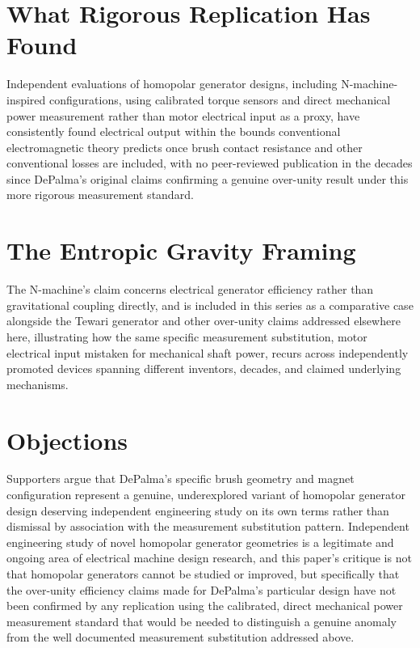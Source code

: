 \documentclass[11pt]{article}
\begin{document}
\section{What Rigorous Replication Has Found}

Independent evaluations of homopolar generator designs, including N-machine-inspired configurations, using calibrated torque sensors and direct mechanical power measurement rather than motor electrical input as a proxy, have consistently found electrical output within the bounds conventional electromagnetic theory predicts once brush contact resistance and other conventional losses are included, with no peer-reviewed publication in the decades since DePalma's original claims confirming a genuine over-unity result under this more rigorous measurement standard.

\section{The Entropic Gravity Framing}

The N-machine's claim concerns electrical generator efficiency rather than gravitational coupling directly, and is included in this series as a comparative case alongside the Tewari generator and other over-unity claims addressed elsewhere here, illustrating how the same specific measurement substitution, motor electrical input mistaken for mechanical shaft power, recurs across independently promoted devices spanning different inventors, decades, and claimed underlying mechanisms.

\section{Objections}

Supporters argue that DePalma's specific brush geometry and magnet configuration represent a genuine, underexplored variant of homopolar generator design deserving independent engineering study on its own terms rather than dismissal by association with the measurement substitution pattern. Independent engineering study of novel homopolar generator geometries is a legitimate and ongoing area of electrical machine design research, and this paper's critique is not that homopolar generators cannot be studied or improved, but specifically that the over-unity efficiency claims made for DePalma's particular design have not been confirmed by any replication using the calibrated, direct mechanical power measurement standard that would be needed to distinguish a genuine anomaly from the well documented measurement substitution addressed above.
\end{document}
